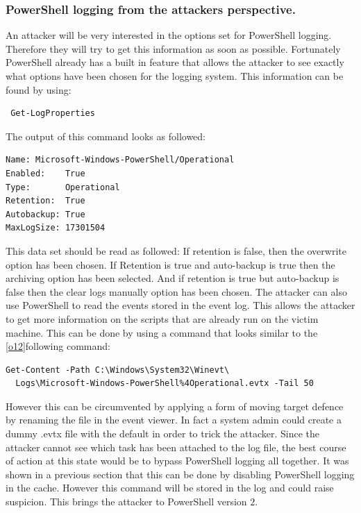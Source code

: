 \documentclass{article}%
\begin{document}
\subsubsection{PowerShell logging from the attackers perspective.}
An attacker will be very interested in the options set for PowerShell logging. Therefore they will try to get this information as soon as possible. Fortunately PowerShell already has a built in feature that allows the attacker to see exactly what options have been chosen for the logging system. This information can be found by using:
\begin{verbatim}
 Get-LogProperties
\end{verbatim}
The output of this command looks as followed:
\begin{verbatim}
Name: Microsoft-Windows-PowerShell/Operational
Enabled:    True
Type:       Operational
Retention:  True
Autobackup: True
MaxLogSize: 17301504
\end{verbatim}
This data set should be read as followed:\newline\newline
If retention is false, then the overwrite option has been chosen. If Retention is true and auto-backup is true then the archiving option has been selected. And if retention is true but auto-backup is false then the clear logs manually option has been chosen. The attacker can also use PowerShell to read the events stored in the event log. This allows the attacker to get more information on the scripts that are already run on the victim machine. This can be done by using a command that looks similar to the [\hyperlink{o12}{o12}]following command:
\begin{verbatim}
Get-Content -Path C:\Windows\System32\Winevt\
  Logs\Microsoft-Windows-PowerShell%4Operational.evtx -Tail 50
\end{verbatim}
However this can be circumvented by applying a form of moving target defence by renaming the file in the event viewer. In fact a system admin could create a dummy .evtx file with the default in order to trick the attacker. Since the attacker cannot see which task has been attached to the log file, the best course of action at this state would be to bypass PowerShell logging all together. It was shown in a previous section that this can be done by disabling PowerShell logging in the cache. However this command will be stored in the log and could raise suspicion. This brings the attacker to PowerShell version $2$.
\end{document}
